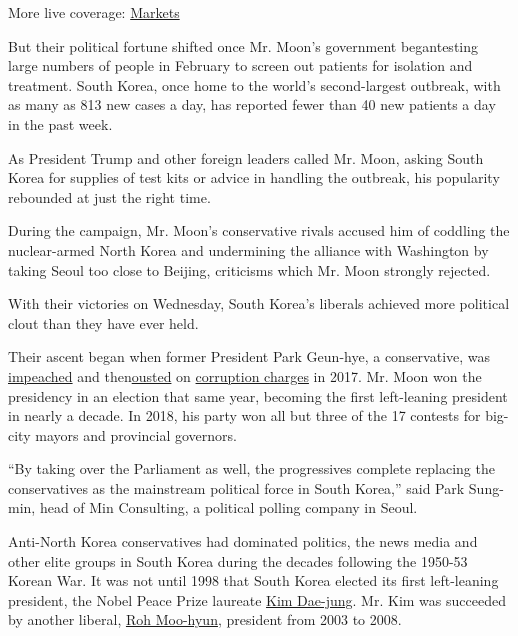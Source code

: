 More live coverage:
\href{https://www.nytimes3xbfgragh.onion/live/2020/07/31/business/stock-market-today-coronavirus?action=click\&pgtype=Article\&state=default\&region=MAIN_CONTENT_1\&context=storylines_live_updates}{Markets}

But their political fortune shifted once Mr. Moon's government ​began
​testing large numbers of people in February to screen out patients for
isolation and treatment. ​South Korea, once home to the world's
second-largest outbreak, with as many as 813 new cases a day, has
reported fewer than 40 new ​patients a day in the past week​.

As President Trump​ and other foreign leaders called Mr. Moon, asking
South Korea for supplies of test kits or advice in handling the
outbreak, his popularity rebounded​ at just the right time.

During the campaign​, Mr. Moon's conservative rivals accused him of
coddling the nuclear-armed North Korea and undermining the alliance with
Washington by taking Seoul too close to Beijing, criticisms which Mr.
Moon ​strongly rejected.

With their victories on Wednesday, South Korea's liberals​ achieved more
political​ clout than they have ever held.​

Their ascent began when former President Park Geun-hye, a conservative,
was
\href{https://www.nytimes3xbfgragh.onion/2016/12/09/world/asia/south-korea-president-park-geun-hye-impeached.html}{impeached}
and
then\href{https://www.nytimes3xbfgragh.onion/2017/03/09/world/asia/park-geun-hye-impeached-south-korea.html?action=click\&contentCollection=Asia\%20Pacific\&module=RelatedCoverage\&region=EndOfArticle\&pgtype=article}{ousted}
on
\href{https://www.nytimes3xbfgragh.onion/2018/04/06/world/asia/park-geun-hye-south-korea.html}{corruption
charges} in 2017. Mr. Moon won the presidency in an election that same
year, becoming the first left-leaning president in nearly a decade. In
2018, his party won all but three of the 17 contests for big-city mayors
and provincial governors.

``By taking over the Parliament as well, the progressives complete
replacing the conservatives as the mainstream political force​ in South
Korea​,'' said Park Sung-min, head of Min Consulting, a political
polling company in Seoul.​

Anti-North Korea conservatives had dominated politics, the news media
and other elite groups in South Korea during the decades following the
1950-53 Korean War. It was not until 1998 that South Korea elected its
first left-leaning president, the Nobel Peace Prize laureate
\href{https://www.nytimes3xbfgragh.onion/2009/08/19/world/asia/19kim.html}{Kim
Dae-jung}. Mr. Kim was succeeded by another liberal,
\href{https://www.nytimes3xbfgragh.onion/2009/05/23/world/asia/23korea.html}{Roh
Moo-hyun}, president from 2003 to 2008.​

